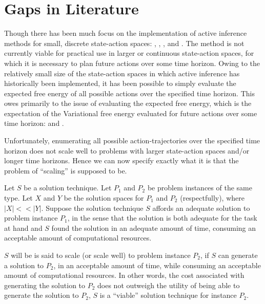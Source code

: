 \documentclass[onecolumn]{IEEEtran}
\begin{document}
\section{Gaps in Literature}
Though there has been much focus on the implementation of active inference methods for small, discrete state-action spaces: \textcite{Applications-of-FEP-Machine-Learning-Neuroscience}, \textcite{AIF-Discrete-Action-Spaces-Synthesis}, \textcite{Step-by-Step-Tutorial-AIF-Empirical-Data}, \textcite{Relationship-Dynamic-Programming-AIF} and \textcite{AIF-Epistemic-Value}. The method is not currently viable for practical use in larger or continuous state-action spaces, for which it is necessary to plan future actions over some time horizon. Owing to the relatively small size of the state-action spaces in which active inference has historically been implemented, it has been possible to simply evaluate the expected free energy of all possible actions over the specified time horizon. This owes primarily to the issue of evaluating the expected free energy, which is the expectation of the Variational free energy evaluated for future actions over some time horizon: \textcite{Message-Passing-Perspective-Planning-Under-AIF} and \textcite{Bayesian-Policy-Selection-Using-AIF}. 

Unfortunately, enumerating all possible action-trajectories over the specified time horizon does not scale well to problems with larger state-action spaces
and/or longer time horizons. Hence we can now specify exactly what it is that the problem of ``scaling'' is supposed to be. 

Let $S$ be a solution technique. Let $P_1$ and $P_2$ be problem instances of the same type. Let $X$ and $Y$ be the solution spaces for $P_1$ and $P_2$ (respectfully), where $|X| << |Y|$. Suppose the solution technique $S$ affords an adequate solution to problem instance $P_1$, in the sense that the solution is both adequate for the task at hand and $S$ found the solution in an adequate amount of time, consuming an acceptable amount of computational resources. 

$S$ will be is said to scale (or scale well) to problem instance $P_2$, if $S$ can generate a solution to $P_2$, in an acceptable amount of time, while consuming an acceptable amount of computational resources. In other words, the cost associated with generating the solution to $P_2$ does not outweigh the utility of being able to generate the solution to $P_2$, $S$ is a ``viable'' solution technique for instance $P_2$. 
\end{document}
